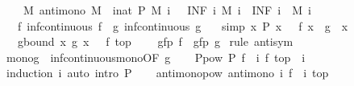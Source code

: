 \begin{isabellebody}
\ \ \ {\isasymalpha}{\isacharcolon}\ {\isachardoublequoteopen}{\isasymAnd}M{\isachardot}\ antimono\ M\ {\isasymLongrightarrow}\ {\isacharparenleft}{\isasymAnd}i{\isacharcolon}{\isacharcolon}nat{\isachardot}\ P\ {\isacharparenleft}M\ i{\isacharparenright}{\isacharparenright}\ {\isasymLongrightarrow}\ {\isasymalpha}\ {\isacharparenleft}INF\ i{\isachardot}\ M\ i{\isacharparenright}\ {\isacharequal}\ {\isacharparenleft}INF\ i{\isachardot}\ {\isasymalpha}\ {\isacharparenleft}M\ i{\isacharparenright}{\isacharparenright}{\isachardoublequoteclose}\isanewline
\ \ \ f{\isacharcolon}\ {\isachardoublequoteopen}inf{\isacharunderscore}continuous\ f{\isachardoublequoteclose}\ \ g{\isacharcolon}\ {\isachardoublequoteopen}inf{\isacharunderscore}continuous\ g{\isachardoublequoteclose}\isanewline
\ \ \ {\isacharbrackleft}simp{\isacharbrackright}{\isacharcolon}\ {\isachardoublequoteopen}{\isasymAnd}x{\isachardot}\ P\ x\ {\isasymLongrightarrow}\ {\isasymalpha}\ {\isacharparenleft}f\ x{\isacharparenright}\ {\isacharequal}\ g\ {\isacharparenleft}{\isasymalpha}\ x{\isacharparenright}{\isachardoublequoteclose}\isanewline
\ \ \ g{\isacharunderscore}bound{\isacharcolon}\ {\isachardoublequoteopen}{\isasymAnd}x{\isachardot}\ g\ x\ {\isasymle}\ {\isasymalpha}\ {\isacharparenleft}f\ top{\isacharparenright}{\isachardoublequoteclose}\isanewline
\ \ \ {\isachardoublequoteopen}{\isasymalpha}\ {\isacharparenleft}gfp\ f{\isacharparenright}\ {\isacharequal}\ gfp\ g{\isachardoublequoteclose}\isanewline
%
\isadelimproof
%
\endisadelimproof
%
\isatagproof
{}\isamarkupfalse%
\ {\isacharparenleft}rule\ antisym{\isacharparenright}\isanewline
\ \ \isamarkupfalse%
\ mono{\isacharunderscore}g\ {\isacharequal}\ inf{\isacharunderscore}continuous{\isacharunderscore}mono{\isacharbrackleft}OF\ g{\isacharbrackright}\isanewline
\isanewline
\ \ \isamarkupfalse%
\ P{\isacharunderscore}pow{\isacharcolon}\ {\isachardoublequoteopen}P\ {\isacharparenleft}{\isacharparenleft}f\ {\isacharcircum}{\isacharcircum}\ i{\isacharparenright}\ {\isacharparenleft}f\ top{\isacharparenright}{\isacharparenright}{\isachardoublequoteclose}\ \ i\isanewline
\ \ \ \ \isamarkupfalse%
\ {\isacharparenleft}induction\ i{\isacharparenright}\ {\isacharparenleft}auto\ intro{\isacharbang}{\isacharcolon}\ P{\isacharparenright}\isanewline
\isanewline
\ \ \isamarkupfalse%
\ antimono{\isacharunderscore}pow{\isacharcolon}\ {\isachardoublequoteopen}antimono\ {\isacharparenleft}{\isasymlambda}i{\isachardot}\ {\isacharparenleft}f\ {\isacharcircum}{\isacharcircum}\ i{\isacharparenright}\ top{\isacharparenright}{\isachardoublequoteclose}\isanewline

\end{isabellebody}
